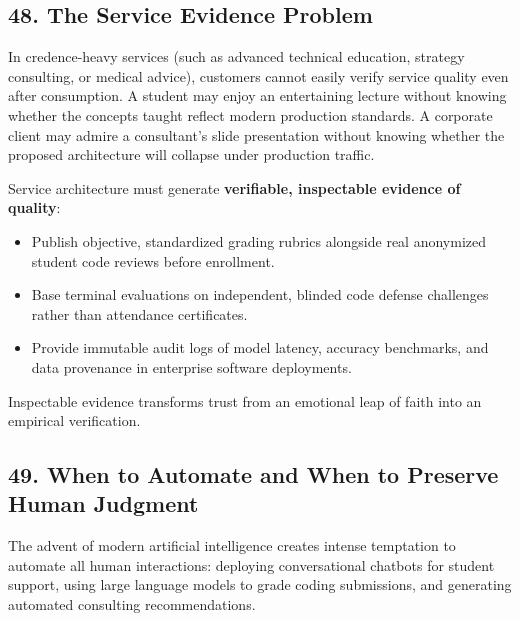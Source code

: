 \subsection*{48. The Service Evidence Problem}

In credence-heavy services (such as advanced technical education, strategy consulting, or medical advice), customers cannot easily verify service quality even after consumption. A student may enjoy an entertaining lecture without knowing whether the concepts taught reflect modern production standards. A corporate client may admire a consultant's slide presentation without knowing whether the proposed architecture will collapse under production traffic.

Service architecture must generate \textbf{verifiable, inspectable evidence of quality}:
\begin{itemize}
    \item Publish objective, standardized grading rubrics alongside real anonymized student code reviews before enrollment.
    \item Base terminal evaluations on independent, blinded code defense challenges rather than attendance certificates.
    \item Provide immutable audit logs of model latency, accuracy benchmarks, and data provenance in enterprise software deployments.
\end{itemize}

Inspectable evidence transforms trust from an emotional leap of faith into an empirical verification.

\subsection*{49. When to Automate and When to Preserve Human Judgment}

The advent of modern artificial intelligence creates intense temptation to automate all human interactions: deploying conversational chatbots for student support, using large language models to grade coding submissions, and generating automated consulting recommendations.


